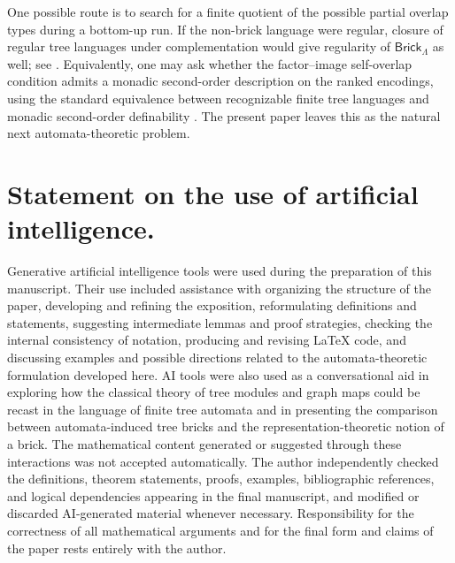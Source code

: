 \documentclass[11pt,a4paper]{amsart}
\theoremstyle{definition}
\theoremstyle{plain}
\theoremstyle{remark}
\numberwithin{equation}{section}
\begin{document}
One possible route is to search for a finite quotient of the possible partial overlap types during a bottom-up run. If the non-brick language were regular, closure of regular tree languages under complementation would give regularity of $\mathsf{Brick}_\Lambda$ as well; see \cite{TATA}. Equivalently, one may ask whether the factor--image self-overlap condition admits a monadic second-order description on the ranked encodings, using the standard equivalence between recognizable finite tree languages and monadic second-order definability \cite{TATA}. The present paper leaves this as the natural next automata-theoretic problem.

\section*{Statement on the use of artificial intelligence.}
Generative artificial intelligence tools were used during the preparation of this manuscript. Their use included assistance with organizing the structure of the paper, developing and refining the exposition, reformulating definitions and statements, suggesting intermediate lemmas and proof strategies, checking the internal consistency of notation, producing and revising \LaTeX{} code, and discussing examples and possible directions related to the automata-theoretic formulation developed here. AI tools were also used as a conversational aid in exploring how the classical theory of tree modules and graph maps could be recast in the language of finite tree automata and in presenting the comparison between automata-induced tree bricks and the representation-theoretic notion of a brick. The mathematical content generated or suggested through these interactions was not accepted automatically. The author independently checked the definitions, theorem statements, proofs, examples, bibliographic references, and logical dependencies appearing in the final manuscript, and modified or discarded AI-generated material whenever necessary. Responsibility for the correctness of all mathematical arguments and for the final form and claims of the paper rests entirely with the author.



\end{document}

